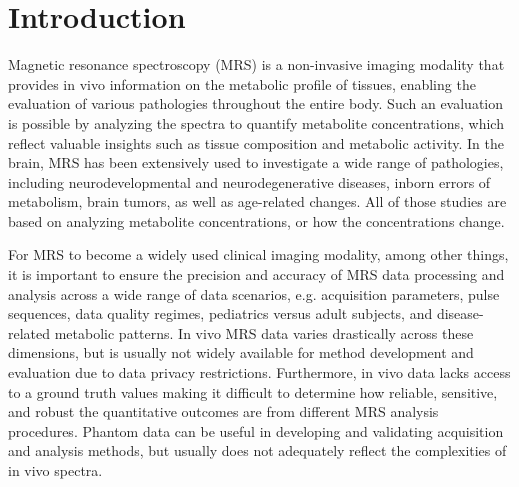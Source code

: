 \section{Introduction}\label{sec:Introduction}
Magnetic resonance spectroscopy (MRS) is a non-invasive imaging modality that provides in vivo information on the metabolic profile of tissues, enabling the evaluation of various pathologies throughout the entire body. Such an evaluation is possible by analyzing the spectra to quantify metabolite concentrations, which reflect valuable insights such as tissue composition and metabolic activity. In the brain, MRS has been extensively used to investigate a wide range of pathologies, including neurodevelopmental\cite{Augustine2008,Laccetta2022,Tomiyasu2022} and neurodegenerative diseases\cite{Gao2014,Martin2007,McKiernan2023,Oz2016}, inborn errors of metabolism\cite{Cecil2006,Gropman2020,Lai2022}, brain tumors\cite{Calvar2005,Lukas2004,Padelli2022,Nelson2003}, as well as age-related changes\cite{Forester2010,Inglese2004,Reyngoudt2012}. All of those studies are based on analyzing metabolite concentrations, or how the concentrations change. %
 
For MRS to become a widely used clinical imaging modality, among other things, it is important to ensure the precision and accuracy of MRS data processing and analysis across a wide range of data scenarios, e.g. acquisition parameters, pulse sequences, data quality regimes, pediatrics versus adult subjects, and disease-related metabolic patterns. In vivo MRS data varies drastically across these dimensions, but is usually not widely available for method development and evaluation due to data privacy restrictions. Furthermore, in vivo data lacks access to a ground truth values making it difficult to determine how reliable, sensitive, and robust the quantitative outcomes are from different MRS analysis procedures. Phantom data can be useful in developing and validating acquisition and analysis methods, but usually does not adequately reflect the complexities of in vivo spectra. %


